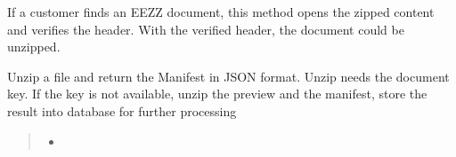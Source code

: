 \documentclass[letterpaper,10pt,english]{sphinxmanual}
\begin{document}
\begin{savenotes}
\begin{fulllineitems}
\begin{savenotes}
\begin{fulllineitems}
\begin{quote}
\begin{description}
\end{description}\end{quote}

\end{fulllineitems}\end{savenotes}


\begin{savenotes}\begin{fulllineitems}
\label{\detokenize{eezz:eezz.document.TDocuments.read_document_header}}
\pysigstartsignatures
{}
\pysigstopsignatures
\sphinxAtStartPar
If a customer finds an EEZZ document, this method opens the zipped content and verifies the header.
With the verified header, the document could be unzipped.
\begin{quote}\begin{description}
\sphinxAtStartPar
{} \textendash{} 

\sphinxAtStartPar


\end{description}\end{quote}

\end{fulllineitems}\end{savenotes}


\begin{savenotes}\begin{fulllineitems}
\label{\detokenize{eezz:eezz.document.TDocuments.unzip}}
\pysigstartsignatures
{}
\pysigstopsignatures
\sphinxAtStartPar
Unzip a file and return the Manifest in JSON format. Unzip needs the document key. If the key is not
available, unzip the preview and the manifest, store the result into database for further processing
\begin{quote}\begin{description}
\begin{itemize}
\item {} 
\sphinxAtStartPar
{} \textendash{} 


\end{itemize}
\end{description}
\end{quote}
\end{fulllineitems}
\end{savenotes}
\end{fulllineitems}
\end{savenotes}
\end{document}
